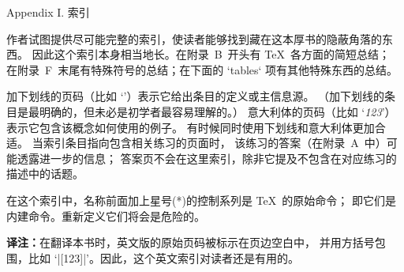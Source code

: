 


\beginchapter Appendix I. 索引

\maxdepth=4pt
作者试图提供尽可能完整的索引，使读者能够找到藏在这本厚书的隐蔽角落的东西。
因此这个索引本身相当地长。在附录~B~开头有 \TeX\ 各方面的简短总结；
在附录~F~末尾有特殊符号的总结；在下面的 `tables` 项有其他特殊东西的总结。

\medskip\ninepoint
加下划线的页码（比如 `’）表示它给出条目的定义或主信息源。%
（加下划线的条目是最明确的，但未必是初学者最容易理解的。）%
意大利体的页码（比如 `{\it123\/}'）表示它包含该概念如何使用的例子。
有时候同时使用下划线和意大利体更加合适。
当索引条目指向包含相关练习的页面时，
该练习的答案（在附录~A~中）可能透露进一步的信息；
答案页不会在这里索引，除非它提及不包含在对应练习的描述中的话题。

\smallskip
在这个索引中，名称前面加上星号(*)的控制系列是 \TeX\ 的原始命令；
即它们是内建命令。重新定义它们将会是危险的。

\smallskip
{\bf 译注：}在翻译本书时，英文版的原始页码被标示在页边空白中，
并用方括号包围，比如 `|[123]|'。因此，这个英文索引对读者还是有用的。

